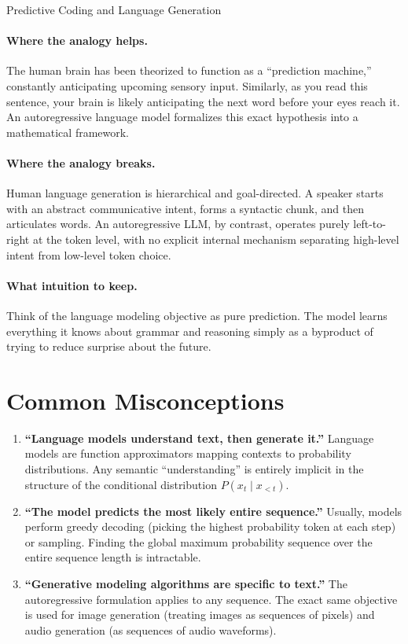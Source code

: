 \begin{analogybox}{Predictive Coding and Language Generation}
  \paragraph{Where the analogy helps.}
  The human brain has been theorized to function as a ``prediction machine,'' constantly anticipating upcoming sensory input. Similarly, as you read this sentence, your brain is likely anticipating the next word before your eyes reach it. An autoregressive language model formalizes this exact hypothesis into a mathematical framework.

  \paragraph{Where the analogy breaks.}
  Human language generation is hierarchical and goal-directed. A speaker starts with an abstract communicative intent, forms a syntactic chunk, and then articulates words. An autoregressive LLM, by contrast, operates purely left-to-right at the token level, with no explicit internal mechanism separating high-level intent from low-level token choice.

  \paragraph{What intuition to keep.}
  Think of the language modeling objective as pure prediction. The model learns everything it knows about grammar and reasoning simply as a byproduct of trying to reduce surprise about the future.
\end{analogybox}


\section{Common Misconceptions}
\label{ch:06:sec:misconceptions}

\begin{enumerate}
  \item \textbf{``Language models understand text, then generate it.''} Language models are function approximators mapping contexts to probability distributions. Any semantic ``understanding'' is entirely implicit in the structure of the conditional distribution $P(x_t \mid x_{<t})$.
  \item \textbf{``The model predicts the most likely entire sequence.''} Usually, models perform greedy decoding (picking the highest probability token at each step) or sampling. Finding the global maximum probability sequence over the entire sequence length is intractable.
  \item \textbf{``Generative modeling algorithms are specific to text.''} The autoregressive formulation applies to any sequence. The exact same objective is used for image generation (treating images as sequences of pixels) and audio generation (as sequences of audio waveforms).
\end{enumerate}


